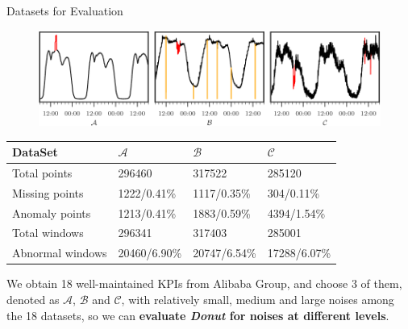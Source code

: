 \documentclass[usenames,dvipsnames]{beamer}
\newcommand{\DONUT}{\textit{Donut}}
\newcommand{\DATASETA}{$\mathcal{A}$}
\newcommand{\DATASETB}{$\mathcal{B}$}
\newcommand{\DATASETC}{$\mathcal{C}$}
\newcommand{\emphasis}[1]{\textbf{\textcolor{emphcolor}{#1}}}
\begin{document}
\begin{frame}{Datasets for Evaluation}
  \vspace{-1em}
  \begin{figure}
    \includegraphics[height=.3\textheight]{kpi}  
  \end{figure}
  \vspace{-1.5em}
  \begin{table}[htbp]
    \footnotesize
    \centering
    \begin{tabular}{
              |p{}
              |p{}
              |p{}
              |p{}
              |
      }
      \hline
      DataSet & \DATASETA{} & \DATASETB{} & \DATASETC{}  \\
      \hline
      Total points & 296460 & 317522 & 285120  \\
      Missing points & 1222/0.41\% & 1117/0.35\% & 304/0.11\%  \\
      Anomaly points & 1213/0.41\% & 1883/0.59\% & 4394/1.54\%  \\
      Total windows & 296341 & 317403 & 285001  \\
      Abnormal windows & 20460/6.90\% & 20747/6.54\%  & 17288/6.07\%  \\
      \hline
    \end{tabular}
  \end{table}
  
  \small
  We obtain 18 well-maintained KPIs from Alibaba Group, and choose 3 of them, denoted as \DATASETA{}, \DATASETB{} and \DATASETC{}, with relatively small, medium and large noises among the 18 datasets, so we can \emphasis{evaluate \DONUT{} for noises at different levels}.
\end{frame}
\end{document}
